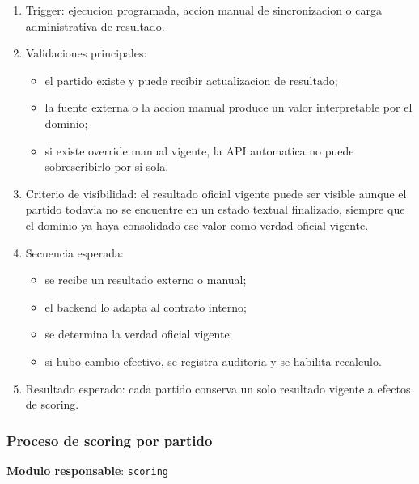 \begin{enumerate}
  \item Trigger: ejecucion programada, accion manual de sincronizacion o carga administrativa de resultado.
  \item Validaciones principales:
    \begin{itemize}
      \item el partido existe y puede recibir actualizacion de resultado;
      \item la fuente externa o la accion manual produce un valor interpretable por el dominio;
      \item si existe override manual vigente, la API automatica no puede sobrescribirlo por si sola.
    \end{itemize}
  \item Criterio de visibilidad: el resultado oficial vigente puede ser visible aunque el partido todavia no se encuentre en un estado textual finalizado, siempre que el dominio ya haya consolidado ese valor como verdad oficial vigente.
  \item Secuencia esperada:
    \begin{itemize}
      \item se recibe un resultado externo o manual;
      \item el backend lo adapta al contrato interno;
      \item se determina la verdad oficial vigente;
      \item si hubo cambio efectivo, se registra auditoria y se habilita recalculo.
    \end{itemize}
  \item Resultado esperado: cada partido conserva un solo resultado vigente a efectos de scoring.
\end{enumerate}

\subsubsection{Proceso de scoring por partido}

\textbf{Modulo responsable}: \texttt{scoring}

